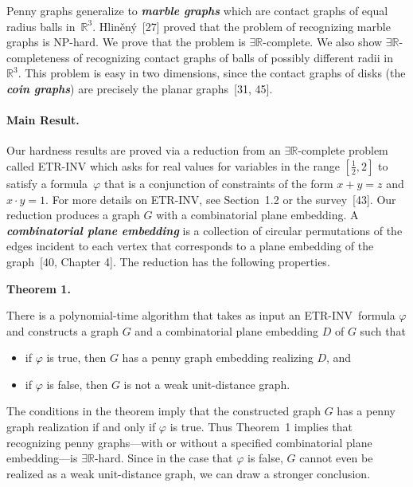 \documentclass{article}
\newcommand{\defn}[1]{\textit{\textbf{\boldmath #1}}}
\begin{document}
Penny graphs generalize to \defn{marble graphs} which are contact graphs of equal radius balls in~$\ensuremath{\mathbb{R}}^3$. 
Hliněný~[27] proved that the problem of recognizing marble graphs is 
\textsf{NP}-hard. 
We prove that the problem is \ensuremath{\exists\mathbb{R}}-complete. 
We also show \ensuremath{\exists\mathbb{R}}-completeness of recognizing contact graphs of balls of possibly different radii in $\ensuremath{\mathbb{R}}^3$.  This problem is easy in two dimensions, since the contact graphs of disks
(the \defn{coin graphs})
are precisely the planar graphs~[31, 45].

\paragraph{Main Result.}
Our hardness results are proved via a reduction from an \ensuremath{\exists\mathbb{R}}-complete problem called \textnormal{\textsc{ETR-INV}} which asks for real values for variables in the range $[\frac{1}{2},2]$ to satisfy a formula~$\varphi$ that is a conjunction of constraints of the form $x + y = z$ and $x \cdot y = 1$. 
For more details on \textnormal{\textsc{ETR-INV}}, see Section~1.2 or the survey~[43].
Our reduction produces a graph $G$ with a combinatorial plane embedding. A \defn{combinatorial plane embedding} is a collection of circular permutations of 
the edges incident to each vertex 
that corresponds to a plane embedding of the graph~[40, Chapter 4].
The reduction has the following properties. 

\par\medskip\noindent\textbf{Theorem 1.} \begin{itshape}
There is a polynomial-time algorithm that takes as input an \textnormal{\textsc{ETR-INV}}\ formula $\varphi$ and constructs a graph $G$ and a combinatorial plane embedding $D$ of $G$ such that
\begin{itemize}
    \item 
    if $\varphi$ is true, then $G$ has a penny graph embedding realizing $D$,
    and
    \item if $\varphi$ is false, then $G$ is not a  weak unit-distance graph.
\end{itemize}
\end{itshape}\par\medskip

The conditions in the theorem imply that the constructed graph $G$ has a penny graph realization if and only if $\varphi$ is true.  Thus Theorem~1 implies that recognizing penny graphs---with or without a specified combinatorial plane embedding---is \ensuremath{\exists\mathbb{R}}-hard. 
Since in the case that $\varphi$ is false, $G$ cannot even be realized as a 
weak unit-distance graph, we can draw a stronger conclusion.
\end{document}
